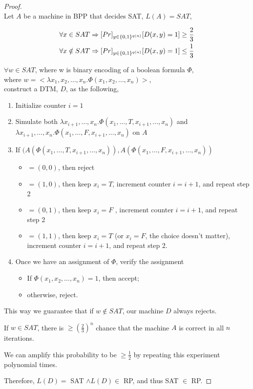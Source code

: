 \documentclass[twoside,11pt]{homework}
\begin{document}
\begin{proof}
  \ \\
  Let $A$ be a machine in BPP that decides SAT, $L(A) = SAT$,
  \begin{given}
    \[
      \begin{aligned}
        \forall x \in SAT \Rightarrow \text[Pr]_{y \in \{0,1\}^{q(n)}}[D(x,y) = 1] \ge \frac{2}{3}\\
        \forall x \notin SAT \Rightarrow \text[Pr]_{y \in \{0,1\}^{q(n)}}[D(x,y) = 1] \le \frac{1}{3}
      \end{aligned}
    \]
  \end{given}
  $\forall w \in SAT$, where w is binary encoding of a boolean formula $\Phi$,\\
  where $w = < \lambda x_1, x_2, \dots, x_n. \Phi(x_1, x_2, \dots, x_n)>$,\\
  construct a DTM, $D$, as the following,
  \begin{enumerate}
  \item Initialize counter $i = 1$
  \item Simulate both $\lambda x_{i+1}, \dots, x_n. \Phi(x_1, \dots, T,x_{i+1}, \dots, x_n)$
    and\\ $\lambda x_{i+1}, \dots, x_n. \Phi(x_1, \dots, F, x_{i+1}, \dots, x_n)$ on $A$
  \item If $(A(\Phi(x_1, \dots, T,x_{i+1}, \dots, x_n)), A(\Phi(x_1, \dots, F, x_{i+1}, \dots, x_n))$
    \begin{itemize}
    \item $= (0,0)$, then reject
    \item $= (1,0)$, then keep $x_{i} = T$, increment counter $i = i + 1$, and repeat step 2
    \item $= (0,1)$, then keep $x_{i} = F$ , increment counter $i = i + 1$, and repeat step 2
    \item $= (1,1)$, then keep $x_{i} = T$ (or $x_{i} = F$, the choice doesn't
      matter), increment counter $i = i + 1$, and repeat step 2.
    \end{itemize}
  \item Once we have an assignment of $\Phi$, verify the assignment
    \begin{itemize}
    \item If $\Phi(x_1, x_2, \dots, x_n) = 1$, then accept;
    \item otherwise, reject.
    \end{itemize}
  \end{enumerate}

  This way we guarantee that if $w \notin SAT$, our machine $D$ always rejects.
  
  If $w \in SAT$, there is $\ge (\frac{2}{3})^n$ chance that the machine $A$ is
  correct in all $n$ iterations.

  We can amplify this probability to be $\ge \frac{1}{2}$ by repeating this
  experiment polynomial times.
  
  Therefore, $L(D) =$ SAT $\land L(D) \in$ RP, and thus SAT $\in$ RP.
\end{proof}
\end{document}
